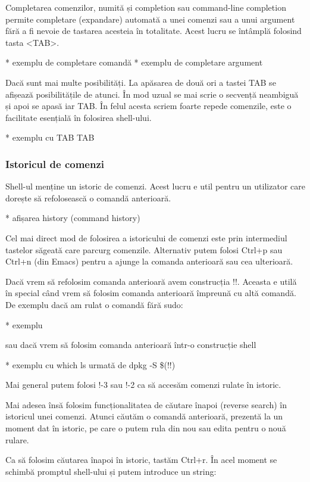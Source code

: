 Completarea comenzilor, numită și completion sau command-line completion permite
completare (expandare) automată a unei comenzi sau a unui argument fără a fi
nevoie de tastarea acesteia în totalitate. Acest lucru se întâmplă folosind
tasta <TAB>.

* exemplu de completare comandă
* exemplu de completare argument

Dacă sunt mai multe posibilități. La apăsarea de două ori a tastei TAB se
afișează posibilitățile de atunci. În mod uzual se mai scrie o secvență
neambiguă și apoi se apasă iar TAB. În felul acesta scriem foarte repede
comenzile, este o facilitate esențială în folosirea shell-ului.

* exemplu cu TAB TAB

\subsubsection{Istoricul de comenzi}
\label{sec:cli-history}

Shell-ul menține un istoric de comenzi. Acest lucru e util pentru un utilizator
care dorește să refolosească o comandă anterioară.

* afișarea history (command history)

Cel mai direct mod de folosirea a istoricului de comenzi este prin intermediul
tastelor săgeată care parcurg comenzile. Alternativ putem folosi Ctrl+p sau
Ctrl+n (din Emacs) pentru a ajunge la comanda anterioară sau cea ulterioară.

Dacă vrem să refolosim comanda anterioară avem construcția !!. Aceasta e utilă
în special când vrem să folosim comanda anterioară împreună cu altă comandă. De
exemplu dacă am rulat o comandă fără sudo:

* exemplu

sau dacă vrem să folosim comanda anterioară într-o construcție shell

* exemplu cu which ls urmată de dpkg -S \$(!!)

Mai general putem folosi !-3 sau !-2 ca să accesăm comenzi rulate în istoric.

Mai adesea însă folosim funcționalitatea de căutare înapoi (reverse search) în
istoricul unei comenzi. Atunci căutăm o comandă anterioară, prezentă la un
moment dat în istoric, pe care o putem rula din nou sau edita pentru o nouă
rulare.

Ca să folosim căutarea înapoi în istoric, tastăm Ctrl+r. În acel moment se
schimbă promptul shell-ului și putem introduce un string:

